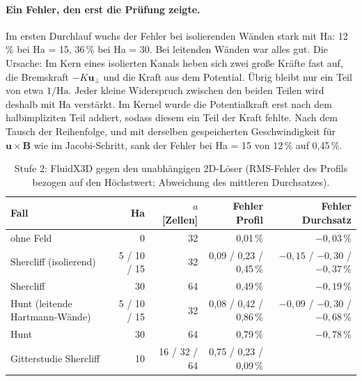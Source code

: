 \paragraph{Ein Fehler, den erst die Prüfung zeigte.} Im ersten Durchlauf wuchs der Fehler bei isolierenden Wänden
stark mit Ha: 12\,\% bei Ha = 15, 36\,\% bei Ha = 30. Bei leitenden Wänden war alles gut. Die Ursache: Im Kern eines
isolierten Kanals heben sich zwei große Kräfte fast auf, die Bremskraft $-K\mathbf{u}_\perp$ und die Kraft aus dem
Potential. Übrig bleibt nur ein Teil von etwa $1/\mathrm{Ha}$. Jeder kleine Widerspruch zwischen den beiden Teilen wird
deshalb mit Ha verstärkt. Im Kernel wurde die Potentialkraft erst nach dem halbimpliziten Teil addiert, sodass diesem
ein Teil der Kraft fehlte. Nach dem Tausch der Reihenfolge, und mit derselben gespeicherten Geschwindigkeit für
$\mathbf{u}\times\mathbf{B}$ wie im Jacobi-Schritt, sank der Fehler bei Ha = 15 von 12\,\% auf 0,45\,\%.

\begin{table}[H]\centering\small
\begin{tabular}{lrrrr}\toprule
Fall & Ha & $a$ [Zellen] & Fehler Profil & Fehler Durchsatz\\\midrule
ohne Feld & 0 & 32 & 0,01\,\% & $-0{,}03$\,\%\\
Shercliff (isolierend) & 5 / 10 / 15 & 32 & 0,09 / 0,23 / 0,45\,\% & $-0{,}15$ / $-0{,}30$ / $-0{,}37$\,\%\\
Shercliff & 30 & 64 & 0,49\,\% & $-0{,}19$\,\%\\
Hunt (leitende Hartmann-Wände) & 5 / 10 / 15 & 32 & 0,08 / 0,42 / 0,86\,\% & $-0{,}09$ / $-0{,}30$ / $-0{,}68$\,\%\\
Hunt & 30 & 64 & 0,79\,\% & $-0{,}78$\,\%\\
Gitterstudie Shercliff & 10 & 16 / 32 / 64 & 0,75 / 0,23 / 0,09\,\% & \\\bottomrule
\end{tabular}\caption{Stufe 2: FluidX3D gegen den unabhängigen 2D-Löser (RMS-Fehler des Profils bezogen auf den
Höchstwert; Abweichung des mittleren Durchsatzes).}\end{table}

